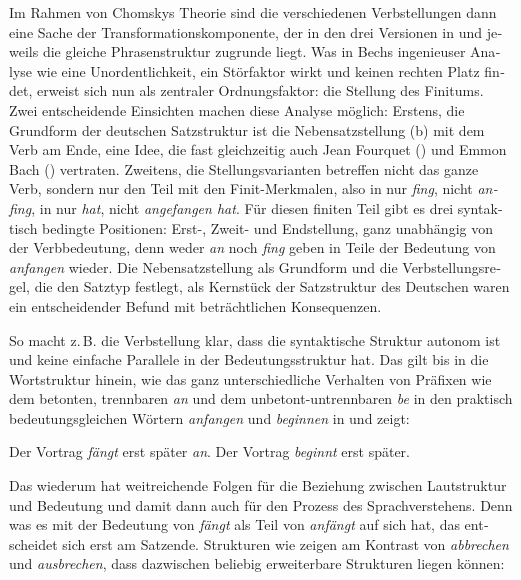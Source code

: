 \documentclass[output=paper,colorlinks,citecolor=brown]{langscibook}
\begin{document}
\begin{otherlanguage}{german}
\noindent Im Rahmen von Chomskys Theorie sind die verschiedenen Verbstellungen dann eine Sache der Transformationskomponente, der in den drei Versionen in  und  jeweils die gleiche Phrasenstruktur zugrunde liegt. Was in Bechs ingenieuser Analyse wie eine Unordentlichkeit, ein Störfaktor wirkt und keinen rechten Platz findet, erweist sich nun als zentraler Ordnungsfaktor: die Stellung des Finitums. Zwei entscheidende Einsichten machen diese Analyse möglich: Erstens, die Grundform der deutschen Satzstruktur ist die Nebensatzstellung (b) mit dem Verb am Ende, eine Idee, die fast gleichzeitig auch Jean Fourquet (\citeyear{Fourquet1959}) und Emmon Bach (\citeyear{Bach1962}) vertraten. Zweitens, die Stellungsvarianten betreffen nicht das ganze Verb, sondern nur den Teil mit den Finit-Merkmalen, also in  nur \textit{fing}, nicht \textit{anfing}, in  nur \textit{hat}, nicht \textit{angefangen hat}. Für diesen finiten Teil gibt es drei syntaktisch bedingte Positionen: Erst-, Zweit- und Endstellung, ganz unabhängig von der Verbbedeutung, denn weder \textit{an} noch \textit{fing} geben in  Teile der Bedeutung von \textit{anfangen} wieder. Die Nebensatzstellung als Grundform und die Verbstellungsregel, die den Satztyp festlegt, als Kernstück der Satzstruktur des Deutschen waren ein entscheidender Befund mit beträchtlichen Konsequenzen.

So macht z.\,B. die Verbstellung klar, dass die syntaktische Struktur autonom ist und keine einfache Parallele in der Bedeutungsstruktur hat. Das gilt bis in die Wortstruktur hinein, wie das ganz unterschiedliche Verhalten von Präfixen wie dem betonten, trennbaren \textit{an} und dem unbetont-untrennbaren \textit{be} in den praktisch bedeutungsgleichen Wörtern \textit{anfangen} und \textit{beginnen} in  und  zeigt:

\ea
\ea Der Vortrag \textit{fängt} erst später \textit{an}. \label{ex:4a}
\ex Der Vortrag \textit{beginnt} erst später. \label{ex:4b}
\z
\label{ex:4}
\z

\noindent Das wiederum hat weitreichende Folgen für die Beziehung zwischen Lautstruktur und Bedeutung und damit dann auch für den Prozess des Sprachverstehens. Denn was es mit der Bedeutung von \textit{fängt} als Teil von \textit{anfängt} auf sich hat, das entscheidet sich erst am Satzende. Strukturen wie  zeigen am Kontrast von \textit{abbrechen} und \textit{ausbrechen}, dass dazwischen beliebig erweiterbare Strukturen liegen können:


\end{otherlanguage}
\end{document}

